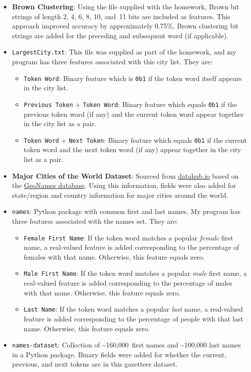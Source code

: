 \documentclass{article}
\begin{document}
  \begin{itemize}
    \item \textbf{Brown Clustering}: Using the file supplied with the homework, Brown bit strings of length 2, 4, 6, 8, 10, and~11 bits are included as features.  This approach improved accuracy by approximately 0.75\%.  Brown clustering bit strings are added for the preceding and subsequent word (if applicable).
    \item \texttt{LargestCity.txt}: This file was supplied as part of the homework, and my program has three features associated with this city list.  They are:
      \begin{itemize}
        \item \texttt{Token Word}: Binary feature which is \texttt{0b1} if the token word itself appears in the city list.
        \item \texttt{Previous Token} + \texttt{Token Word}: Binary feature which equals \texttt{0b1} if the previous token word (if any) and the current token word appear together in the city list as a pair.
        \item \texttt{Token Word} + \texttt{Next Token}: Binary feature which equals \texttt{0b1} if the current token word and the next token word (if any) appear together in the city list as a pair.
      \end{itemize}
    \item \textbf{Major Cities of the World Dataset}: Sourced from \href{https://datahub.io/core/world-cities}{datahub.io} based on the \href{http://www.geonames.org/}{GeoNames database}.  Using this information, fields were also added for state/region and country information for major cities around the world.
    \item \texttt{names}: Python package with common first and last names.  My program has three features associated with the names set.  They are:
      \begin{itemize}
        \item \texttt{Female First Name}: If the token word matches a popular \textit{female} first name, a real-valued feature is added corresponding to the percentage of females with that name.  Otherwise, this feature equals zero.
        \item \texttt{Male First Name}: If the token word matches a popular \textit{male} first name, a real-valued feature is added corresponding to the percentage of males with that name.  Otherwise, this feature equals zero.
        \item \texttt{Last Name}: If the token word matches a popular \textit{last} name, a real-valued feature is added corresponding to the percentage of people with that last name.  Otherwise, this feature equals zero.
      \end{itemize}
    \item \texttt{names-dataset}: Collection of \textasciitilde160,000~first names and \textasciitilde100,000 last names in a Python package.  Binary fields were added for whether the current, previous, and next tokens are in this gazetteer dataset.

  \end{itemize}
\end{document}
